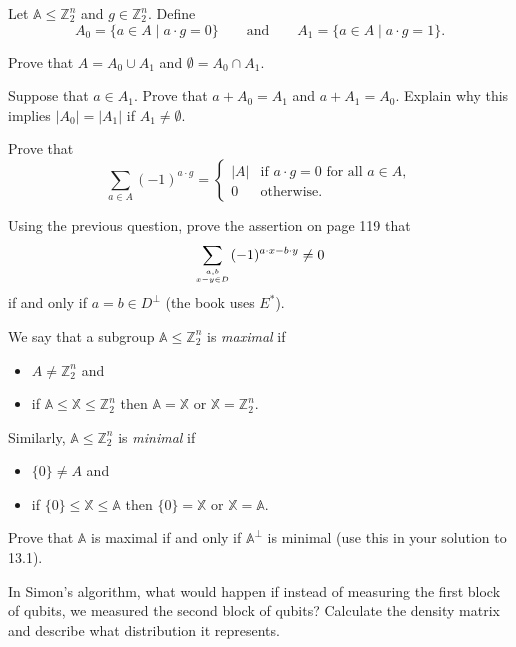 \documentclass[oneside]{amsart}  %
\newcommand{\ZZ}{\mathbb{Z}}
\renewcommand{\AA}{\mathbb{A}}
\newcommand{\m}[1]{\mathbb{#1}}      %
\newcommand{\alg}[1]{\m{#1}}         %
\theoremstyle{plain}
\theoremstyle{definition}
\theoremstyle{remark}
\newcommand{\stack}[2]{\genfrac{}{}{0pt}{}{#1}{#2}}
\numberwithin{equation}{section}  %
\begin{document}
\begin{questions}
\item Let $\AA\leq \ZZ_2^n$ and $g\in \ZZ_2^n$. Define
\[
  A_0
  = \big\{ a\in A \mid a\cdot g = 0 \big\}
  \qquad \text{and} \qquad
  A_1
  = \big\{ a\in A \mid a\cdot g = 1 \big\}.
\]

\begin{questions}
  \item Prove that $A = A_0\cup A_1$ and $\emptyset = A_0\cap A_1$.

  \item Suppose that $a\in A_1$. Prove that $a+A_0 = A_1$ and $a+A_1 = A_0$.
  Explain why this implies $|A_0| = |A_1|$ if $A_1 \neq\emptyset$.

  \item Prove that
  \[
    \sum_{a\in A} (-1)^{a\cdot g}
    = \begin{cases}
      |A| & \text{if } a\cdot g = 0 \text{ for all } a\in A, \\
      0   & \text{otherwise}.
    \end{cases}
  \]
\end{questions}
\item Using the previous question, prove the assertion on page 119 that
\[
  \sum_{\stack{a,b}{x-y\in D}} (-1)^{a\cdot x - b\cdot y} \neq 0
\]
if and only if $a=b\in D^{\perp}$ (the book uses $E^*$).
\item We say that a subgroup $\AA\leq \ZZ_2^n$ is \emph{maximal} if
\begin{itemize}
  \item $A \neq \ZZ_2^n$ and
  \item if $\AA \leq \alg{X}\leq \ZZ_2^n$ then $\AA = \alg{X}$ or $\alg{X} =
    \ZZ_2^n$.
\end{itemize}
Similarly, $\AA\leq \ZZ_2^n$ is \emph{minimal} if
\begin{itemize}
  \item $\{0\} \neq A$ and
  \item if $\{0\} \leq \alg{X}\leq \AA$ then $\{0\} = \alg{X}$ or $\alg{X} =
    \AA$.
\end{itemize}
Prove that $\AA$ is maximal if and only if $\AA^{\perp}$ is minimal (use this in
your solution to 13.1).
\item In Simon's algorithm, what would happen if instead of measuring the first
block of qubits, we measured the second block of qubits? Calculate the density
matrix and describe what distribution it represents.
\end{questions} 
\end{document}
